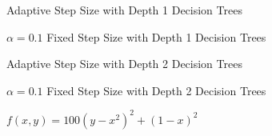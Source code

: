 \documentclass[12pt,a4paper]{article}
\begin{document}
    \begin{figure}
        \centering
        
        \caption{Adaptive Step Size with Depth 1 Decision Trees}
        \label{fig:1}
    \end{figure}
    \begin{figure}
        \centering
        
        \caption{$\alpha = 0.1$ Fixed Step Size with Depth 1 Decision Trees}
        \label{fig:2}
    \end{figure}
    \begin{figure}
        \centering
        
        \caption{Adaptive Step Size with Depth 2 Decision Trees}
        \label{fig:3}
    \end{figure}
    \begin{figure}
        \centering
        
        \caption{$\alpha = 0.1$ Fixed Step Size with Depth 2 Decision Trees}
        \label{fig:4}
    \end{figure}
    \begin{figure}
        \centering
        
        \caption{$f(x,y)=100(y-x^2)^2+(1-x)^2$}
        \label{fig:5}
    \end{figure}
\end{document}

